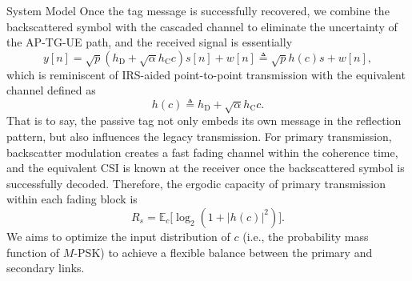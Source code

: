 \documentclass[journal]{IEEEtran}
\newtheorem{remark}{Remark}
\begin{document}
\begin{section}{System Model}
		Once the tag message is successfully recovered, we combine the backscattered symbol with the cascaded channel to eliminate the uncertainty of the AP-TG-UE path, and the received signal is essentially
		\begin{equation}
			y[n] = \sqrt{p} (h_{\mathrm{D}} + \sqrt{\alpha} h_{\mathrm{C}} c) s[n] + w[n] \triangleq \sqrt{p} h(c) s + w[n],
		\end{equation}
		which is reminiscent of IRS-aided point-to-point transmission with the equivalent channel defined as
		\begin{equation}
			h(c) \triangleq h_{\mathrm{D}} + \sqrt{\alpha} h_{\mathrm{C}} c.
		\end{equation}
		That is to say, the passive tag not only embeds its own message in the reflection pattern, but also influences the legacy transmission. For primary transmission, backscatter modulation creates a fast fading channel within the coherence time, and the equivalent CSI is known at the receiver once the backscattered symbol is successfully decoded. Therefore, the ergodic capacity of primary transmission within each fading block is \cite{Tse2005}
		\begin{equation}
			R_s = \mathbb{E}_c \bigl[ \log_2 ( 1 + \lvert h(c) \rvert^2 ) \bigr].
		\end{equation}
		We aims to optimize the input distribution of $c$ (i.e., the probability mass function of $M$-PSK) to achieve a flexible balance between the primary and secondary links.




\end{section}
\end{document}
